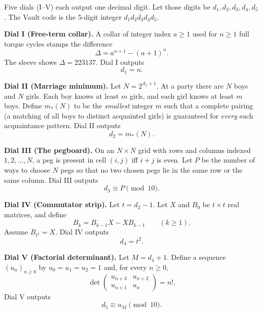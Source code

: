 
\Problem
Five dials (I--V) each output one decimal digit.  Let those digits be \(d_1,d_2,d_3,d_4,d_5\).
The Vault code is the 5-digit integer \(\overline{d_1d_2d_3d_4d_5}\).

\medskip
\noindent\textbf{Dial I (Free-term collar).}
A collar of integer index \(a\ge 1\) used for \(n\ge 1\) full torque cycles stamps the difference
\[
\Delta=a^{n+1}-(a+1)^n.
\]
The sleeve shows \(\Delta=223137\).  Dial I outputs
\[
d_1=n.
\]

\medskip
\noindent\textbf{Dial II (Marriage minimum).}
Let \(N=2^{\,d_1+1}\).
At a party there are \(N\) boys and \(N\) girls.  Each boy knows at least \(m\) girls, and each girl knows at least \(m\) boys.
Define \(m_\ast(N)\) to be the \emph{smallest} integer \(m\) such that a complete pairing (a matching of all boys to distinct acquainted girls) is guaranteed for \emph{every} such acquaintance pattern.
Dial II outputs
\[
d_2=m_\ast(N).
\]

\medskip
\noindent\textbf{Dial III (The pegboard).}
On an \(N\times N\) grid with rows and columns indexed \(1,2,\dots,N\), a peg is present in cell \((i,j)\) iff \(i+j\) is even.
Let \(P\) be the number of ways to choose \(N\) pegs so that no two chosen pegs lie in the same row or the same column.
Dial III outputs
\[
d_3 \equiv P \pmod{10}.
\]

\medskip
\noindent\textbf{Dial IV (Commutator strip).}
Let \(t=d_2-1\).
Let \(X\) and \(B_0\) be \(t\times t\) real matrices, and define
\[
B_{k}=B_{k-1}X-XB_{k-1}\qquad(k\ge 1).
\]
Assume \(B_{t^2}=X\).
Dial IV outputs
\[
d_4=t^2.
\]

\medskip
\noindent\textbf{Dial V (Factorial determinant).}
Let \(M=d_4+1\).
Define a sequence \((u_n)_{n\ge 0}\) by \(u_0=u_1=u_2=1\) and, for every \(n\ge 0\),
\[
\det\!\begin{pmatrix}
u_{n+3} & u_{n+2}\\
u_{n+1} & u_n
\end{pmatrix}
=n!.
\]
Dial V outputs
\[
d_5 \equiv u_M \pmod{10}.
\]

